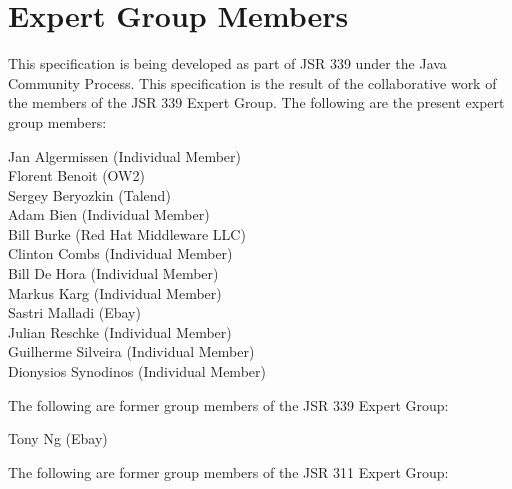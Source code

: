 \section{Expert Group Members} 
\label{expert_group}

This specification is being developed as part of JSR 339 under the Java Community Process. This specification is the result of the collaborative work of the members of the JSR 339 Expert Group. The following are the present expert group members:

Jan Algermissen (Individual Member) \\
Florent Benoit (OW2) \\
Sergey Beryozkin (Talend) \\
Adam Bien (Individual Member) \\
Bill Burke (Red Hat Middleware LLC) \\
Clinton Combs (Individual Member) \\
Bill De Hora (Individual Member) \\ 
Markus Karg (Individual Member) \\
Sastri Malladi (Ebay) \\
Julian Reschke (Individual Member) \\
Guilherme Silveira (Individual Member) \\
Dionysios Synodinos (Individual Member)

The following are former group members of the JSR 339 Expert Group:

Tony Ng (Ebay)

The following are former group members of the JSR 311 Expert Group:


